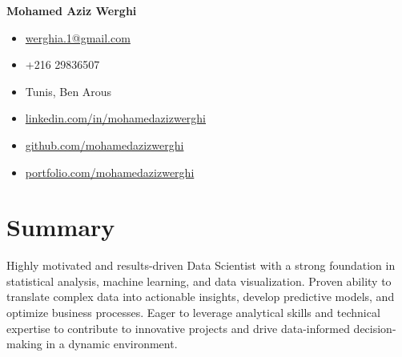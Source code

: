 \documentclass[10pt, letterpaper]{article} %
\begin{document}
\begin{center}
    \vspace{-1em} %
    {\Huge\textbf{Mohamed Aziz Werghi}} \\ %
    \vspace{0.2em} %
    \begin{itemize}[itemsep=0em, parsep=0em, topsep=0em, leftmargin=0pt, labelsep=0.5em, itemindent=0pt]
        \item[\faEnvelope] \href{mailto:werghia.1@gmail.com}{werghia.1@gmail.com}
        \item[\faPhone] +216 29836507
        \item[\faMapMarkerAlt] Tunis, Ben Arous
        \item[\faLinkedin] \href{https://gemini.google.com/app/3fa3e864002f45d4}{linkedin.com/in/mohamedazizwerghi} %
        \item[\faGithub] \href{https://gemini.google.com/app/3fa3e864002f45d4}{github.com/mohamedazizwerghi} %
        \item[\faGlobe] \href{https://gemini.google.com/app/3fa3e864002f45d4}{portfolio.com/mohamedazizwerghi} %
    \end{itemize}
    \vspace{-0.5em} %
\end{center}

\section*{Summary}
\noindent Highly motivated and results-driven Data Scientist with a strong foundation in statistical analysis, machine learning, and data visualization. Proven ability to translate complex data into actionable insights, develop predictive models, and optimize business processes. Eager to leverage analytical skills and technical expertise to contribute to innovative projects and drive data-informed decision-making in a dynamic environment.

\end{document}
